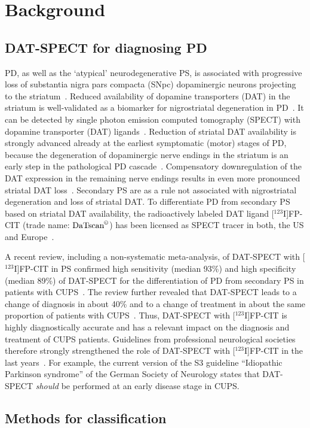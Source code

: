 \section{Background}
\label{sec:background}

\subsection{DAT-SPECT for diagnosing PD}
\label{subsec:datspect}


PD, as well as the `atypical' neurodegenerative PS, is associated with progressive loss of substantia nigra pars compacta (SNpc) dopaminergic neurons 
projecting to the striatum~\citep{Piggott1999}.
Reduced availability of dopamine transporters (DAT) in the striatum is well-validated as a biomarker for nigrostriatal degeneration in PD~\citep{Bernheimer1973, Fazio2018, Niznik1991}.
It can be detected by single photon emission computed tomography (SPECT) with dopamine transporter (DAT) ligands~\citep{Kuikka1995, Abi-Dargham1996}.
Reduction of striatal DAT availability is strongly advanced already at the earliest symptomatic (motor) stages of PD, 
because the degeneration of dopaminergic nerve endings in the striatum is an early step in the pathological PD cascade~\citep{Bernheimer1973, Fazio2018, Niznik1991}. 
Compensatory downregulation of the DAT expression in the remaining nerve endings results in even more pronounced striatal DAT loss~\citep{Lee2000, Saari2017, Honkanen2019}.
Secondary PS are as a rule not associated with nigrostriatal degeneration and loss of striatal DAT. 
To differentiate PD from secondary PS based on striatal DAT availability, the radioactively labeled DAT ligand [$^{123}$I]FP-CIT 
(trade name: $\text{DaTscan}^{\copyright}$) has been licensed as SPECT tracer in both, the US and Europe~\citep{Neumeyer1994}.


A recent review, including a non-systematic meta-analysis, of DAT-SPECT with [$^{123}$I]FP-CIT in PS confirmed high sensitivity (median 93\%) 
and high specificity (median 89\%) of DAT-SPECT for the differentiation of PD from secondary PS in patients with CUPS~\citep{Buchert2019-ya}.
The review further revealed that DAT-SPECT leads to a change of diagnosis in about 40\% and to a change of treatment in about the same proportion of 
patients with CUPS~\citep{Buchert2019-ya}. 
Thus, DAT-SPECT with [$^{123}$I]FP-CIT is highly diagnostically accurate and has a relevant impact on the diagnosis and treatment of CUPS patients. 
Guidelines from professional neurological societies therefore strongly strengthened the role of DAT-SPECT with [$^{123}$I]FP-CIT in the last years~\citep{Tatsch2013}.
For example, the current version of the S3 guideline “Idiopathic Parkinson syndrome” of the German Society of Neurology states that DAT-SPECT 
\textit{should} be performed at an early disease stage in CUPS. 


\subsection{Methods for classification}
\label{subsec:randfors}



